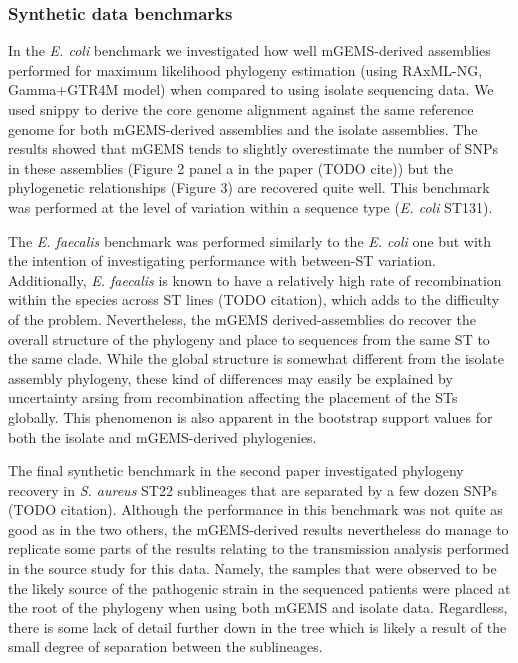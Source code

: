 \documentclass[officiallayout]{tktla}
\begin{document}
\subsubsection{Synthetic data benchmarks}

In the \textit{E. coli} benchmark we investigated how well
mGEMS-derived assemblies performed for maximum likelihood phylogeny
estimation (using RAxML-NG, Gamma+GTR4M model) when compared to using
isolate sequencing data. We used snippy to derive the core genome
alignment against the same reference genome for both mGEMS-derived
assemblies and the isolate assemblies. The results showed that mGEMS
tends to slightly overestimate the number of SNPs in these assemblies
(Figure 2 panel a in the paper (TODO cite)) but the phylogenetic
relationships (Figure 3) are recovered quite well. This benchmark was
performed at the level of variation within a sequence type
(\textit{E. coli} ST131).

The \textit{E. faecalis} benchmark was performed similarly to the
\textit{E. coli} one but with the intention of investigating
performance with between-ST variation. Additionally,
\textit{E. faecalis} is known to have a relatively high rate of
recombination within the species across ST lines (TODO citation),
which adds to the difficulty of the problem. Nevertheless, the mGEMS
derived-assemblies do recover the overall structure of the phylogeny
and place to sequences from the same ST to the same clade. While the
global structure is somewhat different from the isolate assembly
phylogeny, these kind of differences may easily be explained by
uncertainty arsing from recombination affecting the placement of the
STs globally. This phenomenon is also apparent in the bootstrap
support values for both the isolate and mGEMS-derived phylogenies.

The final synthetic benchmark in the second paper investigated
phylogeny recovery in \textit{S. aureus} ST22 sublineages that are
separated by a few dozen SNPs (TODO citation). Although the
performance in this benchmark was not quite as good as in the two
others, the mGEMS-derived results nevertheless do manage to replicate
some parts of the results relating to the transmission analysis
performed in the source study for this data. Namely, the samples that
were observed to be the likely source of the pathogenic strain in the
sequenced patients were placed at the root of the phylogeny when using
both mGEMS and isolate data. Regardless, there is some lack of detail
further down in the tree which is likely a result of the small degree
of separation between the sublineages.
\end{document}

